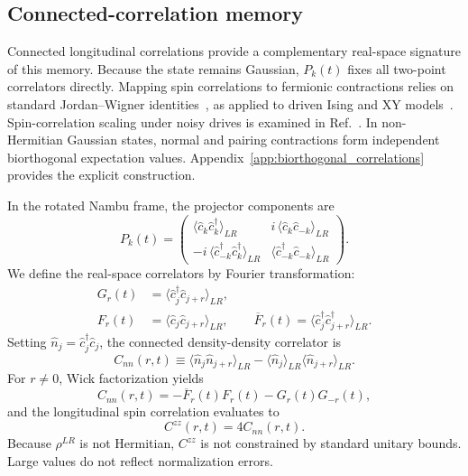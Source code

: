 \documentclass[aps,prb,reprint,superscriptaddress,amsmath,amssymb,floatfix]{revtex4-2}
\begin{document}
\subsection{Connected-correlation memory}
\label{sec:czz_memory}

Connected longitudinal correlations provide a complementary real-space signature of this memory. Because the state remains Gaussian, $P_k(t)$ fixes all two-point correlators directly. Mapping spin correlations to fermionic contractions relies on standard Jordan--Wigner identities~\cite{LiebSchultzMattis1961,BarouchMcCoy1971}, as applied to driven Ising and XY models~\cite{CherngLevitov2006,Cincio2007,SenguptaSen2009,JafariPRR2025,NajiPRB2025}. Spin-correlation scaling under noisy drives is examined in Ref.~\cite{JafariAkbariCorr2026}. In non-Hermitian Gaussian states, normal and pairing contractions form independent biorthogonal expectation values. Appendix~\ref{app:biorthogonal_correlations} provides the explicit construction.

  In the rotated Nambu frame, the projector components are
\begin{equation}
P_k(t) = \begin{pmatrix} \langle \hat c_k \hat c_k^\dagger\rangle_{LR} & i\,\langle \hat c_k \hat c_{-k}\rangle_{LR} \\ -i\,\langle \hat c_{-k}^\dagger \hat c_k^\dagger\rangle_{LR} & \langle \hat c_{-k}^\dagger \hat c_{-k}\rangle_{LR} \end{pmatrix}.
\label{eq:Pk_correlation_blocks}
\end{equation}
We define the real-space correlators by Fourier transformation:
\begin{equation}
\begin{aligned}
G_r(t)&=\langle \hat c_j^\dagger\hat c_{j+r}\rangle_{LR}, \\ F_r(t)&=\langle \hat c_j\hat c_{j+r}\rangle_{LR}, \qquad %
\overline F_r(t)=\langle \hat c_j^\dagger\hat c_{j+r}^\dagger\rangle_{LR}.
\end{aligned} \label{eq:realspace_contractions}
\end{equation}
Setting $\hat n_j=\hat c_j^\dagger\hat c_j$, the connected density-density correlator is
\begin{equation}
C_{nn}(r,t) \equiv \langle \hat n_j\hat n_{j+r}\rangle_{LR} - \langle \hat n_j\rangle_{LR} \langle \hat n_{j+r}\rangle_{LR}.
\label{eq:Cnn_def}
\end{equation}
For $r\neq0$, Wick factorization yields
\begin{equation}
C_{nn}(r,t) = -\overline F_r(t)F_r(t)-G_r(t)G_{-r}(t),
\label{eq:Cnn_wick}
\end{equation}
and the longitudinal spin correlation evaluates to
\begin{equation}
C^{zz}(r,t)=4 C_{nn}(r,t).
\label{eq:Czz}
\end{equation}
Because $\rho^{LR}$ is not Hermitian, $C^{zz}$ is not constrained by standard unitary bounds. Large values do not reflect normalization errors.
\end{document}
